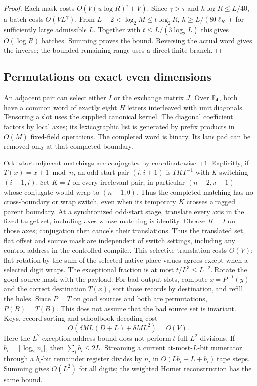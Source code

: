 \begin{proof}
Each mask costs $O(V(u\log R)^\tau+V)$.
Since $\gamma>\tau$ and $h\log R\le L/40$, a batch costs
$O(VL^\gamma)$. From $L-2<\log_2M\le t\log_2R$,
$h\ge L/(80\ell_R)$ for sufficiently large admissible $L$.
Together with $t\le L/(3\log_2L)$ this gives $O(\log R)$ batches.
Summing proves the bound. Reversing the actual word gives the inverse;
the bounded remaining range uses a direct finite branch.
\end{proof}

\subsection{Permutations on exact even dimensions}

An adjacent pair can select either $I$ or the exchange matrix $J$.
Over $\mathbb F_4$, both have a common word of exactly eight $H$ letters
interleaved with unit diagonals. Tensoring a slot uses the supplied
canonical kernel. The diagonal coefficient factors by local axes;
its lexicographic list is generated by prefix products in $O(M)$
fixed-field operations. The completed word is binary. Its lane pad
can be removed only at that completed boundary.

Odd-start adjacent matchings are conjugates by coordinatewise $+1$.
Explicitly, if $T(x)=x+1\bmod n$, an odd-start pair $(i,i+1)$ is
$TKT^{-1}$ with $K$ switching $(i-1,i)$. Set $K=I$ on every
irrelevant pair, in particular $(n-2,n-1)$ whose conjugate would
wrap to $(n-1,0)$. Thus the completed matching has no cross-boundary
or wrap switch, even when its temporary $K$ crosses a ragged parent
boundary.
At a synchronized odd-start stage, translate every axis in the fixed
target set, including axes whose matching is identity. Choose $K=I$
on those axes; conjugation then cancels their translations. Thus the
translated set, flat offset and source mask are independent of switch
settings, including any control address in the controlled compiler.
This selective translation costs $O(V)$: flat rotation by the sum of
the selected native place values agrees except when a selected digit
wraps. The exceptional fraction is at most $t/L^3\le L^{-2}$.
Rotate the good-source mask with the payload. For bad output slots,
compute $x=P^{-1}(y)$ and the correct destination $T(x)$, sort those
records by destination, and refill the holes. Since $P=T$ on good
sources and both are permutations, $P(B)=T(B)$. This does not assume
that the bad source set is invariant. Keys, record sorting and
schoolbook decoding cost
\[
 O(\delta ML(D+L)+\delta ML^2)=O(V).
\]
Here the $L^2$ exception-address bound does not perform $t$ full
$L^2$ divisions. If $b_i=\lceil\log_2n_i\rceil$, then
$\sum_i b_i\le2L$. Streaming a current at-most-$L$-bit numerator
through a $b_i$-bit remainder register divides by $n_i$ in
$O(Lb_i+L+b_i)$ tape steps. Summing gives $O(L^2)$ for all digits;
the weighted Horner reconstruction has the same bound.

